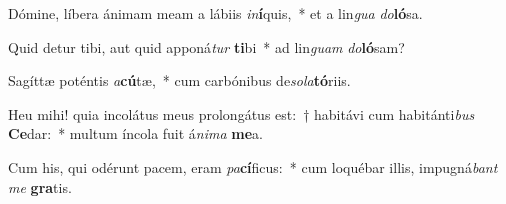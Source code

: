\item Dómine, líbera ánimam meam a lábiis \textit{in}\textbf{í}quis,~* et a lin\textit{gua} \textit{do}\textbf{ló}sa.
\item Quid detur tibi, aut quid apponá\textit{tur} \textbf{ti}bi~* ad lin\textit{guam} \textit{do}\textbf{ló}sam?
\item Sagíttæ poténtis \textit{a}\textbf{cú}tæ,~* cum carbónibus de\textit{so}\textit{la}\textbf{tó}riis.
\item Heu mihi! quia incolátus meus prolongátus est:~† habitávi cum habitánti\textit{bus} \textbf{Ce}dar:~* multum íncola fuit á\textit{ni}\textit{ma} \textbf{me}a.
\item Cum his, qui odérunt pacem, eram \textit{pa}\textbf{cí}ficus:~* cum loquébar illis, impugná\textit{bant} \textit{me} \textbf{gra}tis.
